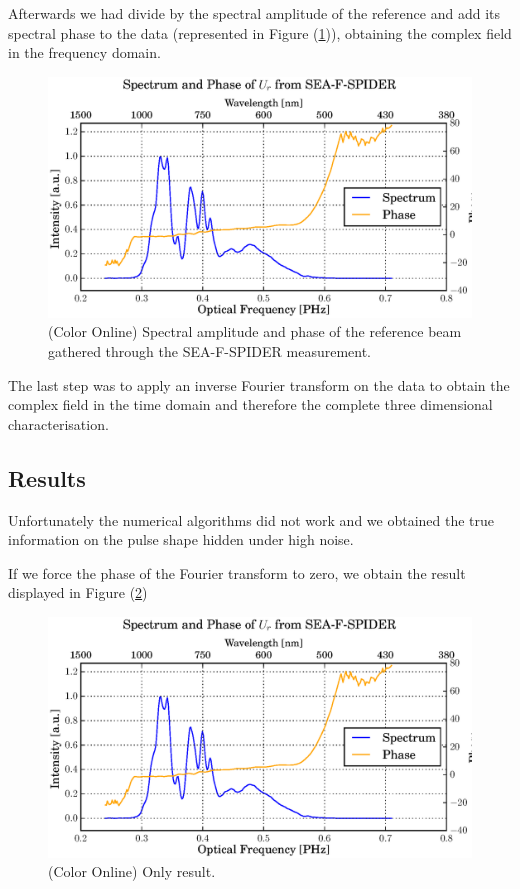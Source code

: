 \documentclass[12pt,a4paper,twoside]{article}
\begin{document}
Afterwards we had divide by the spectral amplitude of the reference and add its spectral phase to the data (represented in Figure (\ref{fig_SPIDER_data})), obtaining the complex field in the frequency domain.
\begin{figure}
	\centering
	\includegraphics[scale=0.9]{data/spider_spectrum_phase}
	\caption{(Color Online) Spectral amplitude and phase of the reference beam gathered through the SEA-F-SPIDER measurement.}
	\label{fig_SPIDER_data}
\end{figure}

The last step was to apply an inverse Fourier transform on the data to obtain the complex field in the time domain and therefore the complete three dimensional characterisation.
\subsection{Results}
Unfortunately the numerical algorithms did not work and we obtained the true information on the pulse shape hidden under high noise.

If we force the phase of the Fourier transform to zero, we obtain the result displayed in Figure (\ref{fig_result})

\begin{figure}
	\centering
	\includegraphics[scale=0.9]{data/spider_spectrum_phase}
	\caption{(Color Online) Only result.}
	\label{fig_result}
\end{figure}
\end{document}
